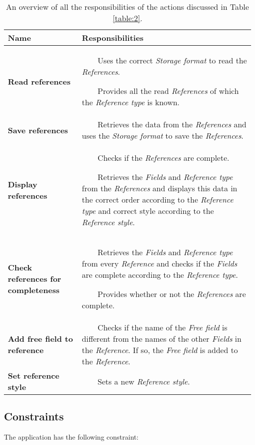 \documentclass[a4paper]{article}
\newcommand{\tabitem}{~~\llap{\textbullet}~~}
\begin{document}
\begin{table}
	\centering
	\caption{An overview of all the responsibilities of the actions discussed in Table \ref{table:2}.}
	\label{table:6}
	\begin{tabular}{|p{3cm}|p{8.5cm}|} \hline
		\textbf{Name} & \textbf{Responsibilities} \\ \hline
		
		\textbf{Read references} & 
			\tabitem Uses the correct \textit{Storage format} to read the \textit{References}. 
			
			\tabitem Provides all the read \textit{References} of which the \textit{Reference type} is known.\\ \hline
		
		\textbf{Save references} & 
			\tabitem Retrieves the data from the \textit{References} and uses the \textit{Storage format} to save the \textit{References}. \\ \hline
		
		\textbf{Display references} &
			\tabitem Checks if the \textit{References} are complete. 
			
			\tabitem Retrieves the \textit{Fields} and \textit{Reference type} from the \textit{References} and displays this data in the correct order according to the \textit{Reference type} and correct style according to the \textit{Reference style}. \\ \hline
		
		\textbf{Check references for completeness} &
			\tabitem Retrieves the \textit{Fields} and \textit{Reference type} from every \textit{Reference} and checks if the \textit{Fields} are complete according to the \textit{Reference type}. 
			
			\tabitem Provides whether or not the \textit{References} are complete.\\ \hline
		
		\textbf{Add free field to reference} & 
			\tabitem Checks if the name of the \textit{Free field} is different from the names of the other \textit{Fields} in the \textit{Reference}. If so, the \textit{Free field} is added to the \textit{Reference}. \\ \hline
		
		\textbf{Set reference style} & 
			\tabitem Sets a new \textit{Reference style}. \\ \hline
	\end{tabular}
\end{table}

\subsection{Constraints}
The application has the following constraint:
\end{document}
